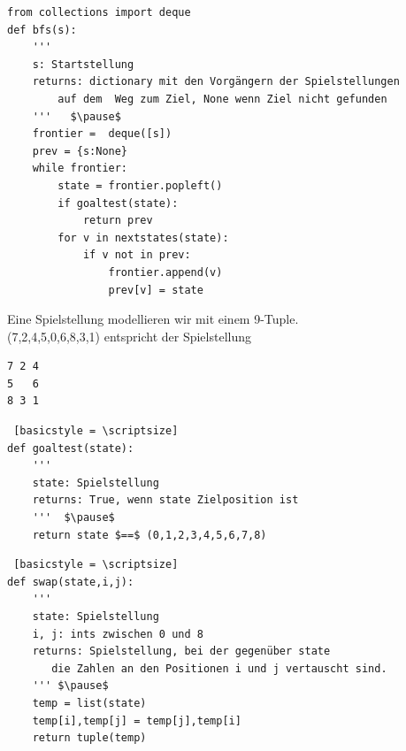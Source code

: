 \begin{frame}[fragile]
\begin{lstlisting} 
from collections import deque
def bfs(s):
    ''' 
    s: Startstellung
    returns: dictionary mit den Vorgängern der Spielstellungen
        auf dem  Weg zum Ziel, None wenn Ziel nicht gefunden
    '''   $\pause$
    frontier =  deque([s])
    prev = {s:None}
    while frontier:
        state = frontier.popleft()  
        if goaltest(state):
            return prev
        for v in nextstates(state):
            if v not in prev:
                frontier.append(v)
                prev[v] = state

\end{lstlisting} 
\end{frame}



\begin{frame}[fragile]
Eine Spielstellung modellieren wir mit einem 9-Tuple. \\
(7,2,4,5,0,6,8,3,1) entspricht der Spielstellung
\begin{lstlisting} 
7 2 4
5   6
8 3 1
\end{lstlisting} 

\begin{lstlisting} [basicstyle = \scriptsize]
def goaltest(state):
    '''
    state: Spielstellung
    returns: True, wenn state Zielposition ist
    '''  $\pause$
    return state $==$ (0,1,2,3,4,5,6,7,8) 
\end{lstlisting} 
\end{frame}

\begin{frame}[fragile]
\begin{lstlisting} [basicstyle = \scriptsize]
def swap(state,i,j):
    '''
    state: Spielstellung
    i, j: ints zwischen 0 und 8
    returns: Spielstellung, bei der gegenüber state 
       die Zahlen an den Positionen i und j vertauscht sind.
    ''' $\pause$
    temp = list(state)
    temp[i],temp[j] = temp[j],temp[i]
    return tuple(temp)
\end{lstlisting} 
\end{frame}

